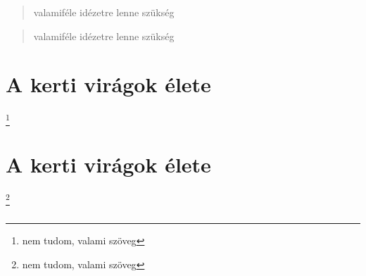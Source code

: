 \documentclass{article}
\begin{document}
\begin{quote}
valamiféle idézetre lenne szükség
\end{quote}

\begin{quotation}
valamiféle idézetre lenne szükség
\end{quotation}
\section[Virágok]{A kerti virágok élete}
\footnote{nem tudom, valami szöveg}
\subsection{}
\hulipsum
\label{címkécske}
\subsection{}
\hulipsum\section[Virágok]{A kerti virágok élete}
\footnote{nem tudom, valami szöveg}
\subsection{}
\hulipsum
\subsection{}
\hulipsum
\end{document}
